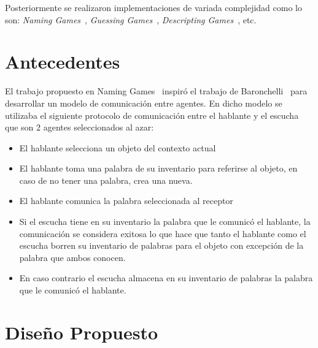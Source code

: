 \documentclass[runningheads]{llncs}
\begin{document}
Posteriormente se realizaron implementaciones de variada complejidad como lo son: \textit{Naming Games}~\cite{RePEc:wsi:acsxxx:v:01:y:1999:i:04:n:s021952599800020x}, \textit{Guessing Games}~\cite{article_beule}, \textit{Descripting Games}~\cite{article_van}, etc.
\section{Antecedentes}
El trabajo propuesto en Naming Games~\cite{RePEc:wsi:acsxxx:v:01:y:1999:i:04:n:s021952599800020x} inspiró el trabajo de Baronchelli~\cite{Baronchelli_2006} para desarrollar un modelo de comunicación entre agentes. En dicho modelo se utilizaba el siguiente protocolo de comunicación entre el hablante y el escucha que son 2 agentes seleccionados al azar:
\begin{itemize}
	\item El hablante selecciona un objeto del contexto actual
	\item El hablante toma una palabra de su inventario para referirse al objeto, en caso de no tener una palabra, crea una nueva.
	\item El hablante comunica la palabra seleccionada al receptor
	\item Si el escucha tiene en su inventario la palabra que le comunicó el hablante, la comunicación se considera exitosa lo que hace que tanto el hablante como el escucha borren su inventario de palabras para el objeto con excepción de la palabra que ambos conocen.
	\item En caso contrario el escucha almacena en su inventario de palabras la palabra que le comunicó el hablante.
\end{itemize}

\section{Diseño Propuesto}
\end{document}
